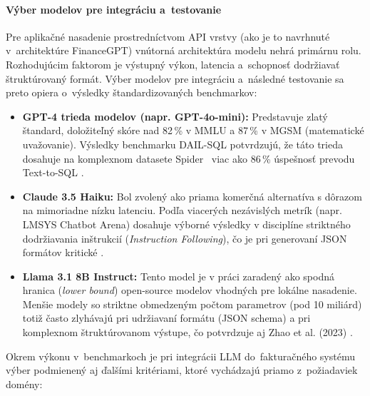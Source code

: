 \paragraph{Výber modelov pre integráciu a~testovanie}
Pre aplikačné nasadenie prostredníctvom API vrstvy (ako je to navrhnuté v~architektúre
FinanceGPT) vnútorná architektúra modelu nehrá primárnu rolu. Rozhodujúcim
faktorom je výstupný výkon, latencia a~schopnosť dodržiavať štruktúrovaný formát.
Výber modelov pre integráciu a~následné testovanie sa preto opiera o~výsledky
štandardizovaných benchmarkov:

\begin{itemize}
	\item \textbf{GPT-4 trieda modelov (napr. GPT-4o-mini):} Predstavuje zlatý
		štandard, doložiteľný skóre nad 82\,\% v MMLU a 87\,\% v MGSM (matematické
		uvažovanie). Výsledky benchmarku DAIL-SQL potvrdzujú, že táto trieda dosahuje
		na komplexnom datasete Spider~\cite{yu2018spider} viac ako 86\,\% úspešnosť prevodu
		Text-to-SQL \cite{gao2023texttosql}. %

	\item \textbf{Claude 3.5 Haiku:} Bol zvolený ako priama komerčná alternatíva s
		dôrazom na mimoriadne nízku latenciu. Podľa viacerých nezávislých metrík (napr.
		LMSYS Chatbot Arena) dosahuje výborné výsledky v disciplíne striktného
		dodržiavania inštrukcií (\textit{Instruction Following}), čo je pri
		generovaní JSON formátov kritické \cite{openrouter2024claude35haiku}.

	\item \textbf{Llama 3.1 8B Instruct:} Tento model je v práci zaradený ako
		spodná hranica (\textit{lower bound}) open-source modelov vhodných pre lokálne
		nasadenie. Menšie modely so striktne obmedzeným počtom parametrov (pod 10 miliárd)
		totiž často zlyhávajú pri udržiavaní formátu (JSON schema) a pri komplexnom
		štruktúrovanom výstupe, čo potvrdzuje aj Zhao et al. (2023) \cite{zhao2023}.
\end{itemize}

Okrem výkonu v~benchmarkoch je pri integrácii LLM do~fakturačného systému výber podmienený
aj ďalšími kritériami, ktoré vychádzajú priamo z~požiadaviek domény:

